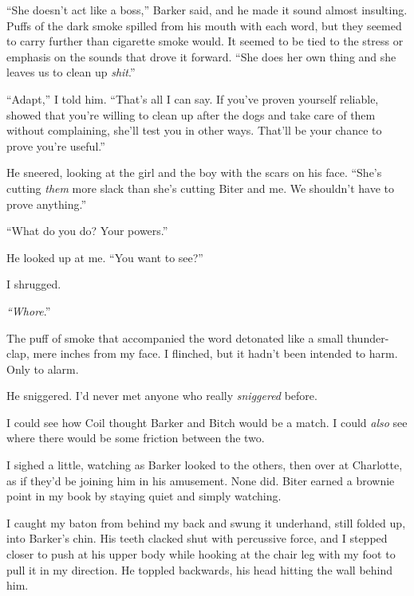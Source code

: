 ``She doesn't act like a boss,'' Barker said, and he made it sound almost insulting.  Puffs of the dark smoke spilled from his mouth with each word, but they seemed to carry further than cigarette smoke would.  It seemed to be tied to the stress or emphasis on the sounds that drove it forward.  ``She does her own thing and she leaves us to clean up \emph{shit}.''



``Adapt,'' I told him.  ``That's all I can say.  If you've proven yourself reliable, showed that you're willing to clean up after the dogs and take care of them without complaining, she'll test you in other ways.  That'll be your chance to prove you're useful.''



He sneered, looking at the girl and the boy with the scars on his face.  ``She's cutting \emph{them} more slack than she's cutting Biter and me.  We shouldn't have to prove anything.''



``What do you do?  Your powers.''



He looked up at me.  ``You want to see?''



I shrugged.



\emph{``Whore}.''



The puff of smoke that accompanied the word detonated like a small thunder-clap, mere inches from my face.  I flinched, but it hadn't been intended to harm.  Only to alarm.



He sniggered.  I'd never met anyone who really \emph{sniggered} before.



I could see how Coil thought Barker and Bitch would be a match.  I could \emph{also} see where there would be some friction between the two.



I sighed a little, watching as Barker looked to the others, then over at Charlotte, as if they'd be joining him in his amusement.  None did.  Biter earned a brownie point in my book by staying quiet and simply watching.



I caught my baton from behind my back and swung it underhand, still folded up, into Barker's chin.  His teeth clacked shut with percussive force, and I stepped closer to push at his upper body while hooking at the chair leg with my foot to pull it in my direction.  He toppled backwards, his head hitting the wall behind him.



